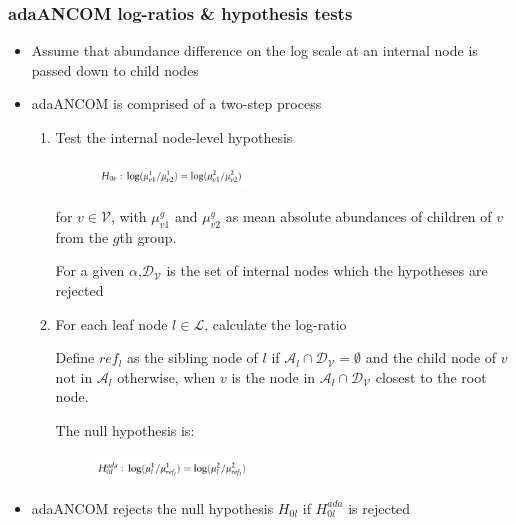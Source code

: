 \documentclass{beamer}
\begin{document}
\begin{frame}
\frametitle{adaANCOM log-ratios \& hypothesis tests}
\begin{itemize}
  \item Assume that abundance difference on the log scale at an internal node is passed down to child nodes
  \item adaANCOM is comprised of a two-step process
  \begin{enumerate}
    \item Test the internal node-level hypothesis
    \begin{figure}[!htb]
	\centering
	\includegraphics[width=0.4\textwidth]{img/internalh0.png}
\end{figure}
for $v \in \mathcal{V}$, with $\mu_{v1}^g$ and $\mu_{v2}^g$ as mean absolute abundances of children of $v$ from the $g$th group.

 For a given $\alpha$,$\mathcal{D}_{\mathcal{V}}$ is the set of internal nodes which the hypotheses are rejected

 \item For each leaf node $l \in \mathcal{L}$, calculate the log-ratio

  Define $ref_l$ as the sibling node of $l$ if $\mathcal{A}_l \cap \mathcal{D}_{\mathcal{V}} = \emptyset$ and the child node of $v$ not in $\mathcal{A}_l$ otherwise, when $v$ is the node in $\mathcal{A}_l \cap \mathcal{D}_{\mathcal{V}}$ closest to the root node.

   The null hypothesis is:
   \begin{figure}[!htb]
	\centering
	\includegraphics[width=0.4\textwidth]{img/h0ref.png}
  \end{figure}


  \end{enumerate}
  \item  adaANCOM rejects the null hypothesis $H_{0l}$ if $H_{0l}^{ada}$ is rejected
\end{itemize}
\end{frame}
\end{document}
